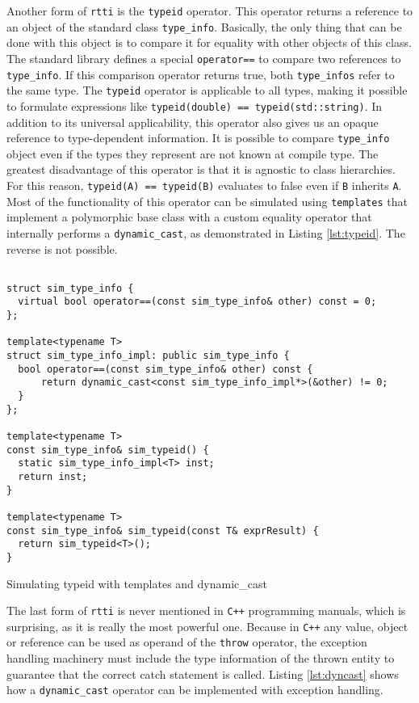 Another form of \texttt{rtti} is the \texttt{typeid} operator. This operator returns a reference to an object of the standard class
\texttt{type\_info}. Basically, the only thing that can be done with this object is to compare it for equality with other objects of
this class. The standard library defines a special \texttt{operator==} to compare two references to \texttt{type\_info}. If this
comparison operator returns true, both \texttt{type\_infos} refer to the same type. The \texttt{typeid} operator is applicable to all
types, making it possible to formulate expressions like \verb|typeid(double) == typeid(std::string)|. In addition to its universal
applicability, this operator also gives us an opaque reference to type-dependent information. It is possible to compare
\texttt{type\_info} object even if the types they represent are not known at compile type. The greatest disadvantage of this
operator is that it is agnostic to class hierarchies. For this reason, \verb|typeid(A) == typeid(B)| evaluates to false even if
\texttt{B} inherits \texttt{A}. Most of the functionality of this operator can be simulated using \texttt{templates} that implement
a polymorphic base class with a custom equality operator that internally performs a \texttt{dynamic\_cast}, as demonstrated in
Listing \ref{lst:typeid}. The reverse is not possible.

\begin{listing}[H]
\begin{verbatim}
 
struct sim_type_info {
  virtual bool operator==(const sim_type_info& other) const = 0;
};

template<typename T>
struct sim_type_info_impl: public sim_type_info {
  bool operator==(const sim_type_info& other) const {
      return dynamic_cast<const sim_type_info_impl*>(&other) != 0;
  }
};

template<typename T>
const sim_type_info& sim_typeid() {
  static sim_type_info_impl<T> inst;
  return inst;
}  

template<typename T>
const sim_type_info& sim_typeid(const T& exprResult) {
  return sim_typeid<T>();
}
\end{verbatim}
\caption{Simulating typeid with templates and dynamic\_cast}
\label{lst:typeid}
\end{listing}

The last form of \texttt{rtti} is never mentioned in \texttt{C++} programming manuals, which is surprising, as it is really the most powerful one.
Because in \texttt{C++} any value, object or reference can be used as operand of the \texttt{throw} operator, the exception handling
machinery must include the type information of the thrown entity to guarantee that the correct catch statement is called.
Listing \ref{lst:dyncast} shows how a \texttt{dynamic\_cast} operator can be implemented with exception handling.

